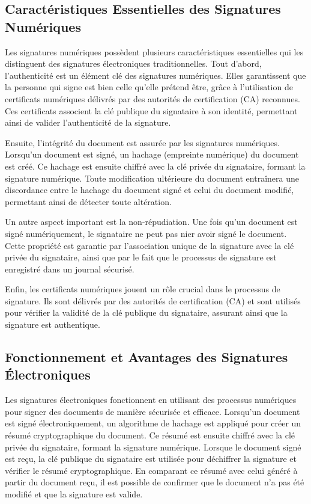\subsection{Caractéristiques Essentielles des Signatures Numériques}

Les signatures numériques possèdent plusieurs caractéristiques essentielles qui les distinguent des signatures électroniques traditionnelles. Tout d'abord, l'authenticité est un élément clé des signatures numériques. Elles garantissent que la personne qui signe est bien celle qu'elle prétend être, grâce à l'utilisation de certificats numériques délivrés par des autorités de certification (CA) reconnues. Ces certificats associent la clé publique du signataire à son identité, permettant ainsi de valider l'authenticité de la signature.

Ensuite, l'intégrité du document est assurée par les signatures numériques. Lorsqu'un document est signé, un hachage (empreinte numérique) du document est créé. Ce hachage est ensuite chiffré avec la clé privée du signataire, formant la signature numérique. Toute modification ultérieure du document entraînera une discordance entre le hachage du document signé et celui du document modifié, permettant ainsi de détecter toute altération.

Un autre aspect important est la non-répudiation. Une fois qu'un document est signé numériquement, le signataire ne peut pas nier avoir signé le document. Cette propriété est garantie par l'association unique de la signature avec la clé privée du signataire, ainsi que par le fait que le processus de signature est enregistré dans un journal sécurisé.

Enfin, les certificats numériques jouent un rôle crucial dans le processus de signature. Ils sont délivrés par des autorités de certification (CA) et sont utilisés pour vérifier la validité de la clé publique du signataire, assurant ainsi que la signature est authentique.

\subsection{ Fonctionnement et Avantages des Signatures Électroniques}

Les signatures électroniques fonctionnent en utilisant des processus numériques pour signer des documents de manière sécurisée et efficace. Lorsqu'un document est signé électroniquement, un algorithme de hachage est appliqué pour créer un résumé cryptographique du document. Ce résumé est ensuite chiffré avec la clé privée du signataire, formant la signature numérique. Lorsque le document signé est reçu, la clé publique du signataire est utilisée pour déchiffrer la signature et vérifier le résumé cryptographique. En comparant ce résumé avec celui généré à partir du document reçu, il est possible de confirmer que le document n'a pas été modifié et que la signature est valide.

